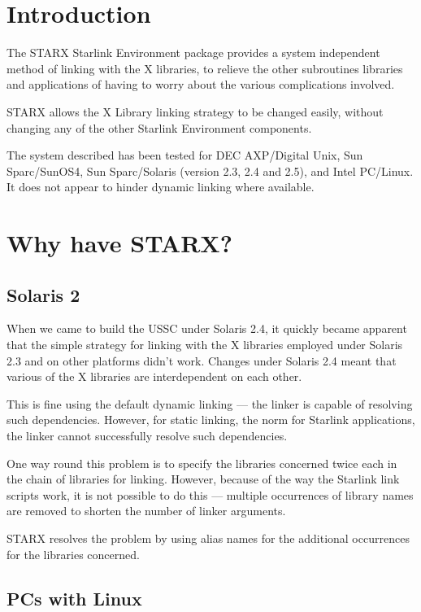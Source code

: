 \documentclass[11pt,nolof,noabs]{starlink}
\begin{document}
\scfrontmatter

\section{Introduction}

The STARX Starlink Environment package provides a system independent
method of linking with the X libraries, to relieve the other
subroutines libraries and applications of having to worry about the
various complications involved.

STARX allows the X Library linking strategy to be changed easily, without
changing any of the other Starlink Environment components.

The system described has been tested for DEC AXP/Digital Unix, Sun
Sparc/SunOS4, Sun Sparc/Solaris (version 2.3, 2.4 and 2.5), and Intel
PC/Linux.  It does not appear to hinder dynamic linking where
available.

\section{Why have STARX?}

\subsection{Solaris 2}

When we came to build the USSC under Solaris 2.4, it quickly became
apparent that the simple strategy for linking with the X libraries
employed under Solaris 2.3 and on other platforms didn't work.  Changes
under Solaris 2.4 meant that various of the X libraries are
interdependent on each other.

This is fine using the default dynamic linking --- the linker is
capable of resolving such dependencies.  However, for static linking,
the norm for Starlink applications, the linker cannot successfully
resolve such dependencies.

One way round this problem is to specify the libraries concerned twice
each in the chain of libraries for linking. However, because of the
way the Starlink link scripts work, it is not possible to do this ---
multiple occurrences of library names are removed to shorten the number
of linker arguments.

STARX resolves the problem by using alias names for the additional
occurrences for the libraries concerned.

\subsection{PCs with Linux}
\end{document}
